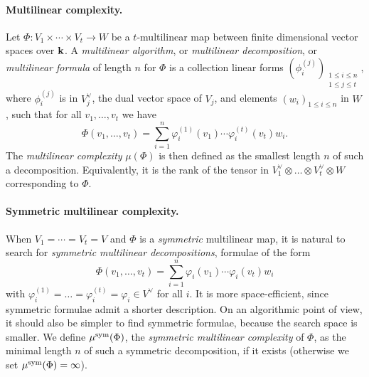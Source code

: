 \documentclass[11pt]{article}
\begin{document}
\paragraph{Multilinear complexity.}
Let $\Phi:V_1\times\cdots\times V_t\to W$
be a $t$-multilinear map between finite dimensional vector spaces over $\mathbf{k}$.
A \emph{multilinear algorithm}, or \emph{multilinear decomposition}, or \emph{multilinear formula} of length $n$ for $\Phi$ is a collection linear
forms $(\phi_i^{(j)})_{\substack{1\leq i \leq n\\1\leq j\leq t}}$,
where $\phi_i^{(j)}$ is in $V_j^\vee$, the dual vector space of $V_j$,
and elements $(w_i)_{1\leq i \leq n}$ in $W$, 
such that for all $v_1,\dots,v_t$ we have
\[
  \Phi(v_1,\dots,v_t)=\sum_{i=1}^{n}\varphi_i^{(1)}(v_1)\cdots\varphi_i^{(t)}(v_t)w_i.
\]
The \emph{multilinear complexity} $\mu(\Phi)$ is then defined as the smallest
length $n$ of such a decomposition.
Equivalently, it is the rank of the tensor in
$V_1^\vee \otimes\dots\otimes V_t^\vee\otimes W$
corresponding to $\Phi$.

\paragraph{Symmetric multilinear complexity.}
When $V_1=\cdots=V_t=V$ and $\Phi$ is a \emph{symmetric} multilinear map, it is
natural to search for \emph{symmetric multilinear decompositions}, \ie formulae of the form
\begin{equation*}
  \Phi(v_1,\dots,v_t)=\sum_{i=1}^{n}\varphi_i(v_1)\cdots\varphi_i(v_t)w_i
\end{equation*}
with $\varphi_i^{(1)}=\dots=\varphi_i^{(t)}=\varphi_i\in V^\vee$ for all $i$.
It is more space-efficient, since symmetric formulae admit a shorter description.
On an algorithmic point of view, it should also be simpler to find symmetric formulae,
because the search space is smaller. 
We define $\mu^{\textrm{sym}}(\Phi)$,
the \emph{symmetric multilinear complexity} of $\Phi$,
as the minimal length $n$ of such a symmetric decomposition, if it exists
(otherwise we set $\mu^{\textrm{sym}}(\Phi)=\infty$).
\end{document}
